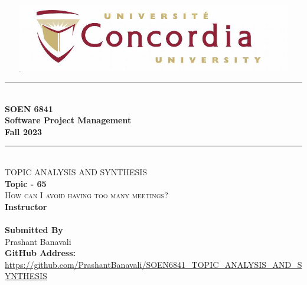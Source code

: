 \addtolength{\topmargin}{2in}
\begin{titlepage} 
\newcommand{\HRule}{\rule{\linewidth}{0.5mm}} %
\center %
\includegraphics[width=150mm,height=30mm,scale=0.5]{TAS/Images/ConcordiaLogo.png} 
\HRule\\[1.0cm]

{\huge\bfseries  SOEN 6841 }\\[0.7cm]
{\huge\bfseries Software Project Management}\\[0.5cm] %
{\huge\bfseries Fall 2023}\\[0.4cm] %
\HRule\\[1.5cm]
\textsc{\Large TOPIC ANALYSIS AND SYNTHESIS}\\[0.5cm] 
\huge
\textbf{Topic - 65}\\
\textsc{How can I avoid having too many meetings?}\\[1cm]
\large
\vfill\vfill\vfill\vfill
\textbf{Instructor}\\
\\[1cm]
\large
 \textbf{Submitted By}\\
Prashant Banavali \\[1cm]
\textbf{GitHub Address:} \url{https://github.com/PrashantBanavali/SOEN6841_TOPIC_ANALYSIS_AND_SYNTHESIS}
\vfill %
\end{titlepage}
